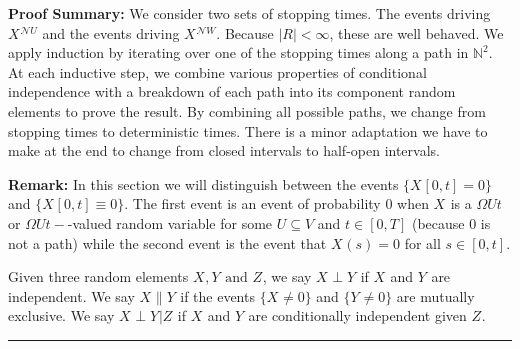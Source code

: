 \documentclass[12pt]{article}
\newcommand{\skipLine}{\vspace{12pt}}
\newcommand{\mb}{\mathbb}
\newcommand{\mc}{\mathcal}
\newcommand{\te}{\text}
\newcommand{\pfsum}{\textbf{Proof Summary: }}
\newcommand{\ind}{\hspace{24pt}}
\newcommand{\lin}{\rule{\linewidth}{0.4 pt}}
\newcommand{\neigh}{\mc{N}}					%
\renewcommand{\U}{U}							%
\newcommand{\UU}{W}								%
\newcommand{\UUU}{R}							%
\newcommand{\T}{T}								%
\renewcommand{\t}{t}							%
\renewcommand{\tt}{s}							%
\newcommand{\V}{V}									%
\newcommand{\rxvt}[2]{X_{#1}{(#2)}}					%
\newcommand{\rxvts}[2]{X_{#1}{#2}}					%
\newcommand{\rxvtts}[2]{Y_{#1}{#2}}					%
\newcommand{\rxvttts}[2]{Z_{#1}{#2}}				%
\newcommand{\mutex}{\|}								%
\begin{document}
\pfsum We consider two sets of stopping times. The events driving \(\rxvts{}{}^{\neigh{\U}}\) and the events driving \(\rxvts{}{}^{\neigh{\UU}}\). Because \(|\UUU| < \infty\), these are well behaved. We apply induction by iterating over one of the stopping times along a path in \(\mb{N}^2\). At each inductive step, we combine various properties of conditional independence with a breakdown of each path into its component random elements to prove the result. By combining all possible paths, we change from stopping times to deterministic times. There is a minor adaptation we have to make at the end to change from closed intervals to half-open intervals.

\skipLine

\textbf{Remark:} In this section we will distinguish between the events \(\{\rxvts{}{[0,\t]} = 0\}\) and \(\{\rxvts{}{[0,\t]}\equiv 0\}\). The first event is an event of probability 0 when \(\rxvts{}{}\) is a \(\Omega{\U}{\t}\) or \(\Omega{\U}{\t-}\)-valued random variable for some \(\U\subseteq \V\) and \(\t \in [0,\T]\) (because 0 is not a path) while the second event is the event that \(\rxvt{}{\tt} = 0\) for all \(\tt \in [0,\t]\).

\ind Given three random elements \(\rxvts{}{},\rxvtts{}{} \te{ and } \rxvttts{}{}\), we say \(\rxvts{}{}\perp \rxvtts{}{}\) if \(\rxvts{}{}\) and \(\rxvtts{}{}\) are independent. We say \(\rxvts{}{}\mutex \rxvtts{}{}\) if the events \(\{\rxvts{}{}\neq 0\}\) and \(\{\rxvtts{}{} \neq 0\}\) are mutually exclusive. We say \(\rxvts{}{}\perp \rxvtts{}{}|\rxvttts{}{}\) if \(\rxvts{}{}\) and \(\rxvtts{}{}\) are conditionally independent given \(\rxvttts{}{}\).

\lin
\end{document}
